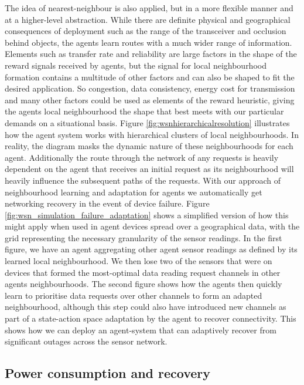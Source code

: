 The idea of nearest-neighbour is also applied, but in a more flexible manner and at a higher-level abstraction. While there are definite physical and geographical consequences of deployment such as the range of the transceiver and occlusion behind objects, the agents learn routes with a much wider range of information. Elements such as transfer rate and reliability are large factors in the shape of the reward signals received by agents, but the signal for local neighbourhood formation contains a multitude of other factors and can also be shaped to fit the desired application. So congestion, data consistency, energy cost for transmission and many other factors could be used as elements of the reward heuristic, giving the agents local neighbourhood the shape that best meets with our particular demands on a situational basis. Figure \ref{fig:wsnhierarchicalresolution} illustrates how the agent system works with hierarchical clusters of local neighbourhoods. In reality, the diagram masks the dynamic nature of these neighbourhoods for each agent. Additionally the route through the network of any requests is heavily dependent on the agent that receives an initial request as its neighbourhood will heavily influence the subsequent paths of the requests.
\newline
\newline
With our approach of neighbourhood learning and adaptation for agents we automatically get networking recovery in the event of device failure. Figure \ref{fig:wsn_simulation_failure_adaptation} shows a simplified version of how this might apply when used in agent devices spread over a geographical data, with the grid representing the necessary granularity of the sensor readings. In the first figure, we have an agent aggregating other agent sensor readings as defined by its learned local neighbourhood. We then lose two of the sensors that were on devices that formed the most-optimal data reading request channels in other agents neighbourhoods. The second figure shows how the agents then quickly learn to prioritise data requests over other channels to form an adapted neighbourhood, although this step could also have introduced new channels as part of a state-action space adaptation by the agent to recover connectivity. This shows how we can deploy an agent-system that can adaptively recover from significant outages across the sensor network.


\subsection{Power consumption and recovery}

